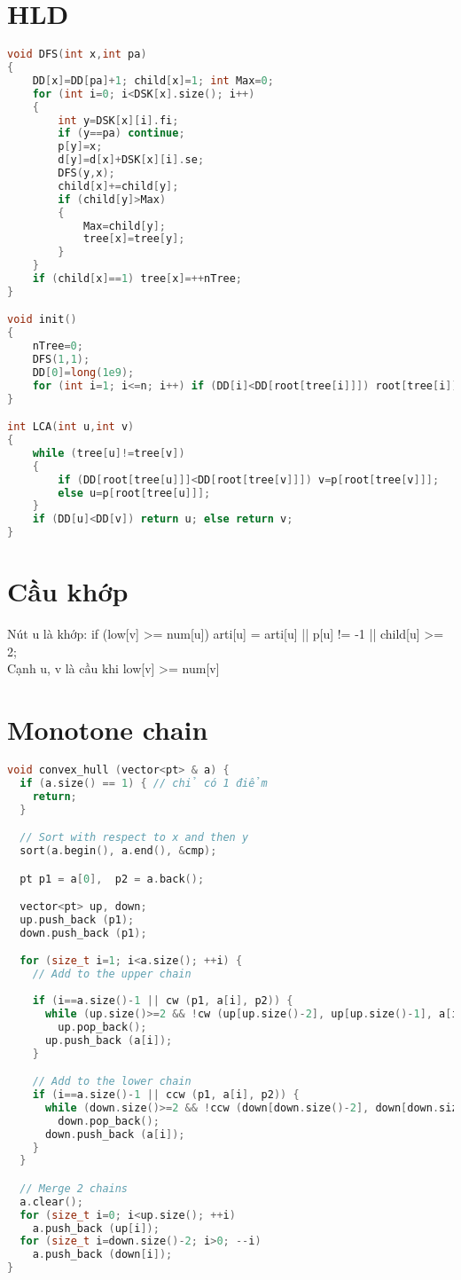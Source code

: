 \documentclass[A4 paper, 12pt]{article}
\begin{document}
	\section{HLD}
	\begin{lstlisting}[language=C++]
void DFS(int x,int pa)
{
    DD[x]=DD[pa]+1; child[x]=1; int Max=0;
    for (int i=0; i<DSK[x].size(); i++)
    {
        int y=DSK[x][i].fi;
        if (y==pa) continue;
        p[y]=x;
        d[y]=d[x]+DSK[x][i].se;
        DFS(y,x);
        child[x]+=child[y];
        if (child[y]>Max)
        {
            Max=child[y];
            tree[x]=tree[y];
        }
    }
    if (child[x]==1) tree[x]=++nTree;
}

void init()
{
    nTree=0;
    DFS(1,1);
    DD[0]=long(1e9);
    for (int i=1; i<=n; i++) if (DD[i]<DD[root[tree[i]]]) root[tree[i]]=i;
}

int LCA(int u,int v)
{
    while (tree[u]!=tree[v])
    {
        if (DD[root[tree[u]]]<DD[root[tree[v]]]) v=p[root[tree[v]]];
        else u=p[root[tree[u]]];
    }
    if (DD[u]<DD[v]) return u; else return v;
}
\end{lstlisting}
	\section{Cầu khớp}
Nút u là khớp: 
if (low[v] >= num[u]) arti[u] = arti[u] || p[u] != -1 || child[u] >= 2;\\
Cạnh u, v là cầu khi low[v] >= num[v]
	\section{Monotone chain}
	\begin{lstlisting}[language=C++]
void convex_hull (vector<pt> & a) {
  if (a.size() == 1) { // chỉ có 1 điểm
    return;
  }

  // Sort with respect to x and then y
  sort(a.begin(), a.end(), &cmp);

  pt p1 = a[0],  p2 = a.back();

  vector<pt> up, down; 
  up.push_back (p1);
  down.push_back (p1);

  for (size_t i=1; i<a.size(); ++i) { 
    // Add to the upper chain
    
    if (i==a.size()-1 || cw (p1, a[i], p2)) {
      while (up.size()>=2 && !cw (up[up.size()-2], up[up.size()-1], a[i]))
        up.pop_back();
      up.push_back (a[i]);
    }

    // Add to the lower chain
    if (i==a.size()-1 || ccw (p1, a[i], p2)) {
      while (down.size()>=2 && !ccw (down[down.size()-2], down[down.size()-1], a[i]))
        down.pop_back();
      down.push_back (a[i]);
    }
  }

  // Merge 2 chains
  a.clear();
  for (size_t i=0; i<up.size(); ++i)
    a.push_back (up[i]);
  for (size_t i=down.size()-2; i>0; --i)
    a.push_back (down[i]);
}
\end{lstlisting}
\end{document}
